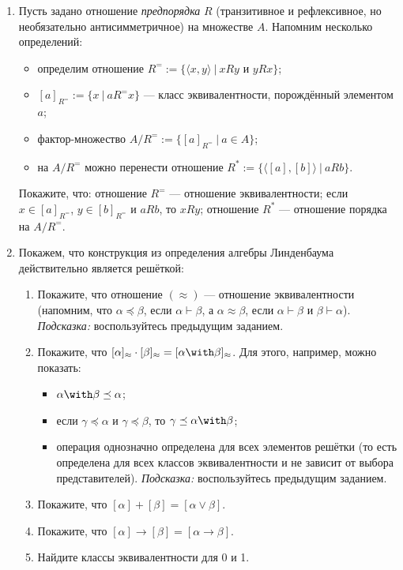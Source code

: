 \documentclass[10pt,a4paper,oneside]{article}
\begin{document}
\begin{enumerate}
\item Пусть задано отношение \emph{предпорядка} $R$ (транзитивное и рефлексивное, но необязательно антисимметричное) на множестве $A$.
Напомним несколько определений:
\begin{itemize}
\item определим отношение $R^= := \{ \langle x,y \rangle\ |\ xRy \text{ и } yRx \}$;
\item $[a]_{R^=} := \{ x\ |\ aR^=x \}$ --- класс эквивалентности, порождённый элементом $a$;
\item фактор-множество $A/{R^=} := \{ [a]_{R^=}\ |\ a \in A \}$;
\item на $A/{R^=}$ можно перенести отношение $R^* := \{ \langle [a],[b] \rangle\ |\ aRb \}$.
\end{itemize}

Покажите, что: отношение $R^=$ --- отношение эквивалентности; если $x \in [a]_{R^=}$, $y \in [b]_{R^=}$ и $aRb$, то $xRy$; отношение $R^*$ ---
отношение порядка на $A/{R^=}$.

\item Покажем, что конструкция из определения алгебры Линденбаума действительно является решёткой:
\begin{enumerate}
\item Покажите, что отношение $(\approx)$ --- отношение эквивалентности (напомним, что $\alpha\preceq\beta$, если $\alpha\vdash\beta$, а $\alpha\approx\beta$, если
$\alpha\vdash\beta$ и $\beta\vdash\alpha$). \emph{Подсказка:} воспользуйтесь предыдущим заданием.
\item Покажите, что $[\alpha]_\approx\cdot[\beta]_\approx = [\alpha\with\beta]_\approx$. Для этого, например, можно показать: 
\begin{itemize}
\item $\alpha\with\beta \preceq \alpha$;
\item если $\gamma \preceq \alpha$ и $\gamma\preceq\beta$, то $\gamma\preceq\alpha\with\beta$;
\item операция однозначно определена для всех элементов решётки (то есть определена для всех классов 
эквивалентности и не зависит от выбора представителей). \emph{Подсказка:} воспользуйтесь предыдущим заданием.
\end{itemize}
\item Покажите, что $[\alpha]+[\beta]=[\alpha\vee\beta]$. 
\item Покажите, что $[\alpha]\rightarrow[\beta]=[\alpha\rightarrow\beta]$.
\item Найдите классы эквивалентности для 0 и 1.
\end{enumerate}

\end{enumerate}
\end{document}
